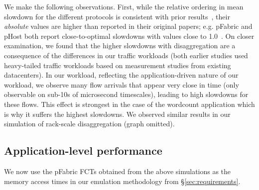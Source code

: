 We make the following observations. 
First, while the relative ordering in mean slowdown for the different protocols is consistent with prior results~\cite{phost}, their \emph{absolute} values are higher than reported 
in their original papers; e.g. pFabric and pHost both report close-to-optimal slowdowns with values close to 1.0~\cite{phost,pfabric}. 
On closer examination, we found that the higher slowdowns with disaggregation are a consequence of the differences in our traffic workloads (both earlier studies used heavy-tailed traffic workloads based on measurement 
studies from existing datacenters). In our \dis workload, reflecting the 
application-driven nature of our workload, we observe many flow arrivals that 
appear very close in time (only observable on sub-10s of microsecond timescales), leading to high slowdowns for these flows. This effect is strongest in the case of the wordcount application which is why it suffers the highest slowdowns. 
We observed similar results in our simulation of rack-scale disaggregation (graph omitted).
%
%
\subsection{Application-level performance}
\label{ssec:alp}
We now use the pFabric FCTs obtained from the above simulations as the memory access times in our emulation methodology from \S\ref{sec:requirements}. 

